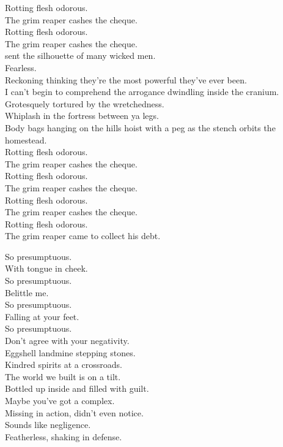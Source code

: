 Rotting flesh odorous. \\
The grim reaper cashes the cheque. \\
Rotting flesh odorous. \\
The grim reaper cashes the cheque. \\

 sent the silhouette of many wicked men. \\
Fearless. \\
Reckoning thinking they're the most powerful they've ever been. \\
I can't begin to comprehend the arrogance dwindling inside the cranium. \\
Grotesquely tortured by the wretchedness. \\
Whiplash in the fortress between ya legs. \\
Body bags hanging on the hills hoist with a peg as the stench orbits the homestead. \\

Rotting flesh odorous. \\
The grim reaper cashes the cheque. \\
Rotting flesh odorous. \\
The grim reaper cashes the cheque. \\
Rotting flesh odorous. \\
The grim reaper cashes the cheque. \\
Rotting flesh odorous. \\
The grim reaper came to collect his debt. \\




So presumptuous. \\
With tongue in cheek. \\
So presumptuous. \\
Belittle me. \\
So presumptuous. \\
Falling at your feet. \\
So presumptuous. \\
Don't agree with your negativity. \\

Eggshell landmine stepping stones. \\
Kindred spirits at a crossroads. \\
The world we built is on a tilt. \\
Bottled up inside and filled with guilt. \\
Maybe you've got a  complex. \\
Missing in action, didn't even notice. \\
Sounds like negligence. \\
Featherless, shaking in defense. \\

